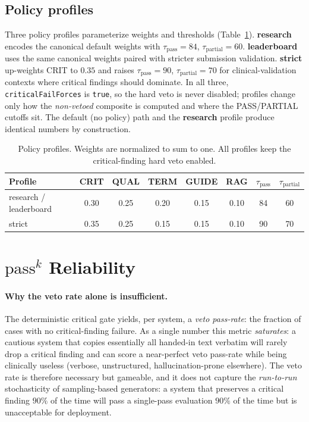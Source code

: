 \documentclass[11pt]{article}
\newcommand{\dimname}[1]{\textsc{#1}}
\begin{document}
\subsection{Policy profiles}

Three policy profiles parameterize weights and thresholds
(Table~\ref{tab:policies}). \textbf{research} encodes the canonical default
weights with $\tau_{\text{pass}}=84$, $\tau_{\text{partial}}=60$.
\textbf{leaderboard} uses the same canonical weights paired with stricter
submission validation. \textbf{strict} up-weights \dimname{CRIT} to $0.35$ and
raises $\tau_{\text{pass}}=90$, $\tau_{\text{partial}}=70$ for clinical-validation
contexts where critical findings should dominate. In all three,
\texttt{criticalFailForces} is \texttt{true}, so the hard veto is never disabled;
profiles change only how the \emph{non-vetoed} composite is computed and where
the PASS/PARTIAL cutoffs sit. The default (no policy) path and the
\textbf{research} profile produce identical numbers by construction.

\begin{table}[t]
\centering
\small
\begin{tabular}{@{}lccccccc@{}}
\toprule
Profile & \dimname{CRIT} & \dimname{QUAL} & \dimname{TERM} & \dimname{GUIDE} &
\dimname{RAG} & $\tau_{\text{pass}}$ & $\tau_{\text{partial}}$ \\
\midrule
research / leaderboard & 0.30 & 0.25 & 0.20 & 0.15 & 0.10 & 84 & 60 \\
strict & 0.35 & 0.25 & 0.15 & 0.15 & 0.10 & 90 & 70 \\
\bottomrule
\end{tabular}
\caption{Policy profiles. Weights are normalized to sum to one. All profiles keep
the critical-finding hard veto enabled.}
\label{tab:policies}
\end{table}

\section{\texorpdfstring{$\mathrm{pass}^{k}$}{pass-k} Reliability}
\label{sec:passk}

\paragraph{Why the veto rate alone is insufficient.} The deterministic critical
gate yields, per system, a \emph{veto pass-rate}: the fraction of cases with no
critical-finding failure. As a single number this metric \emph{saturates}: a
cautious system that copies essentially all handed-in text verbatim will rarely
drop a critical finding and can score a near-perfect veto pass-rate while being
clinically useless (verbose, unstructured, hallucination-prone elsewhere). The
veto rate is therefore necessary but gameable, and it does not capture the
\emph{run-to-run} stochasticity of sampling-based generators: a system that
preserves a critical finding $90\%$ of the time will pass a single-pass
evaluation $90\%$ of the time but is unacceptable for deployment.
\end{document}
